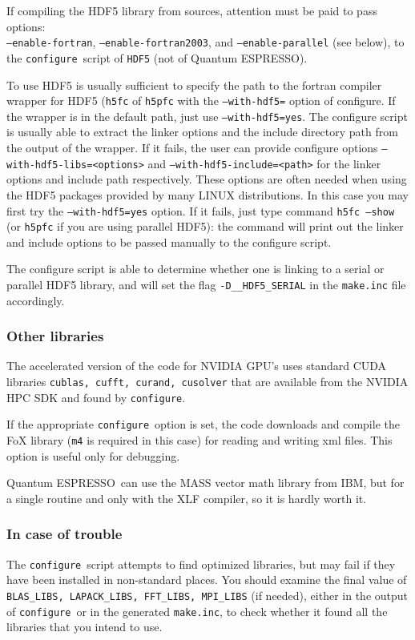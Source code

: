 \documentclass[12pt,a4paper]{article}
\def\qe{{\sc Quantum ESPRESSO}}
\def\configure{\texttt{configure}}
\begin{document}
If compiling the HDF5 library from sources, attention must be paid
to pass options:\\
\texttt{--enable-fortran}, \texttt{--enable-fortran2003}, and 
\texttt{--enable-parallel} (see below),
to the \configure{}ript of \texttt{HDF5} (not of \qe).

To use HDF5 is usually sufficient to specify the path to the fortran
compiler wrapper for HDF5 (\texttt{h5fc} of \texttt{h5pfc} with the
\texttt{--with-hdf5=} option of configure. If the wrapper is in the
default path, just use \texttt{--with-hdf5=yes}.
The configure script is usually able to extract the linker options
and the include directory path from the output of the wrapper. If it
fails, the user can provide configure options
\texttt{--with-hdf5-libs=<options>} and \texttt{--with-hdf5-include=<path>}
for the linker options and include path respectively.
These options are often needed when using the HDF5 packages
provided by many LINUX distributions. In this case you may first try
the \texttt{--with-hdf5=yes} option. If it fails, just type command
\texttt{h5fc --show} (or \texttt{h5pfc} if you are using parallel HDF5):
the command will print out the linker and include options to be passed
manually to the configure script.

The configure script is able to determine whether one is linking to a
serial or parallel HDF5 library, and will  set the flag
\texttt{-D\_\_HDF5\_SERIAL} in the \texttt{make.inc} file accordingly.


\subsubsection{Other libraries}
The accelerated version of the code for NVIDIA GPU's uses standard CUDA
libraries \texttt{cublas, cufft, curand, cusolver} that are available 
from the NVIDIA HPC SDK and found by \configure.

If the appropriate \configure\ option is set, the code downloads and compile 
the FoX library (\texttt{m4} is required in this case) for reading and writing
xml files.  This option is useful only for debugging. 

\qe\ can use the MASS vector math library from IBM, but for a single routine
and only with the XLF compiler, so it is hardly worth it.

\subsubsection{In case of trouble}
The \configure\ script attempts to find optimized libraries, but may fail
if they have been installed in non-standard places. You should examine
the final value of \texttt{BLAS\_LIBS, LAPACK\_LIBS, FFT\_LIBS, MPI\_LIBS} (if needed), either in the output of \configure\ or in the generated
\texttt{make.inc}, to check whether it found all the libraries that you intend to use.
\end{document}
